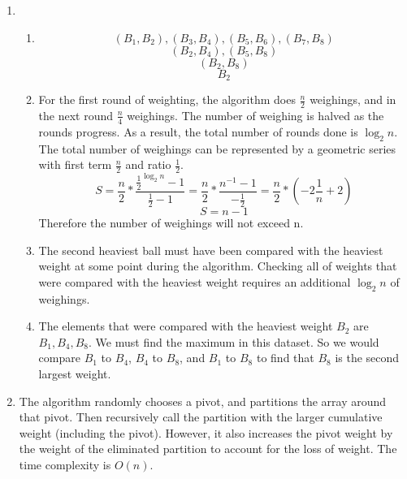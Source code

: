 \documentclass[11pt, letterpaper]{article}
\begin{document}
\begin{enumerate}
    \item
      \begin{enumerate}
        \item
          \[ (B_1, B_2), (B_3, B_4), (B_5, B_6), (B_7, B_8) \]
          \[ (B_2, B_4), (B_5, B_8) \]
          \[ (B_2, B_8) \]
          \[ \boxed{B_2} \]
        \item
          For the first round of weighting, the algorithm does $\frac{n}{2}$ weighings, and in the
          next round $\frac{n}{4}$ weighings. The number of weighing is halved as the rounds progress.
          As a result, the total number of rounds done is $\log _2 n$.
          The total number of weighings can be represented by a geometric series with first term $\frac{n}{2}$
          and ratio $\frac{1}{2}$.
          \[ S = \frac{n}{2}*\frac{\frac{1}{2}^{\log _2 n} - 1}{\frac{1}{2} - 1}
               = \frac{n}{2}*\frac{n^{-1} - 1}{-\frac{1}{2}} = \frac{n}{2}*(-2\frac{1}{n}+2) \]
          \[ S = n - 1 \]
          Therefore the number of weighings will not exceed n.
        \item
          The second heaviest ball must have been compared with the heaviest weight at some point during the
          algorithm. Checking all of weights that were compared with the heaviest weight requires an additional $\log _2 n$ of weighings.
        \item
          The elements that were compared with the heaviest weight $B_2$ are ${B_1, B_4, B_8}$. We must find
          the maximum in this dataset. So we would compare $B_1$ to $B_4$, $B_4$ to $B_8$, and $B_1$ to $B_8$
          to find that $B_8$ is the second largest weight.
      \end{enumerate}

    \item
      The algorithm randomly chooses a pivot, and partitions the array around that pivot. Then recursively call
      the partition with the larger cumulative weight (including the pivot). However, it also increases the pivot
      weight by the weight of the eliminated partition to account for the loss of weight. The time complexity is $O(n)$.
  \end{enumerate}
\end{document}
